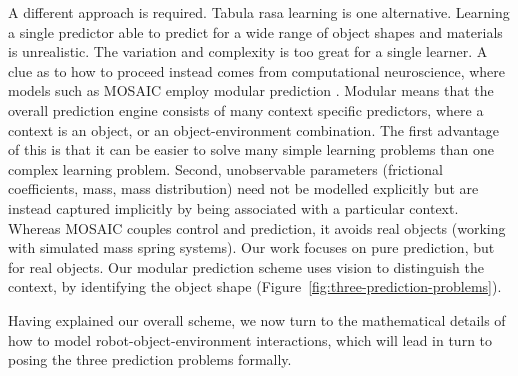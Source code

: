 A different approach is required. Tabula rasa learning is one alternative.  Learning a single predictor able to predict for a wide range of object shapes and materials is unrealistic. The variation and complexity is too great for a single learner. A clue as to how to proceed instead comes from computational neuroscience, where models such as MOSAIC employ modular prediction \cite{Haruno_MOSAIC_2008}. Modular means that the overall prediction engine consists of many context specific predictors, where a context is an object, or an object-environment combination. The first advantage of this is that it can be easier to solve many simple learning problems than one complex learning problem. Second, unobservable parameters (frictional coefficients, mass, mass distribution) need not be modelled explicitly but are instead captured implicitly by being associated with a particular context. Whereas MOSAIC couples control and prediction, it avoids real objects (working with simulated mass spring systems). Our work focuses on pure prediction, but for real objects. Our modular prediction scheme uses vision to distinguish the context, by identifying the object shape (Figure~\ref{fig:three-prediction-problems}).

Having explained our overall scheme, we now turn to the mathematical details of how to model robot-object-environment interactions, which will lead in turn to posing the three prediction problems formally.
